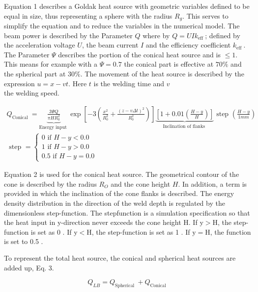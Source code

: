\documentclass[10pt]{article}
\begin{document}
Equation 1 describes a Goldak heat source with geometric variables defined to be equal in size, thus representing a sphere with the radius $R_{g}$. This serves to simplify the equation and to reduce the variables in the numerical model. The beam power is described by the Parameter $Q$ where by $Q=U I k_{\text {eff }}$; defined by the acceleration voltage $U$, the beam current $I$ and the efficiency coefficient $k_{\text {eff }}$. The Parameter $\Psi$ describes the portion of the conical heat source and is $\leq 1$. This means for example with a $\Psi=0.7$ the conical part is effective at $70 \%$ and the spherical part at $30 \%$. The movement of the heat source is described by the expression $u=x-v t$. Here $t$ is the welding time and $v$\\
the welding speed.


\begin{gather*}
Q_{\text {Conical }}=\underbrace{\frac{3 \Psi Q}{\pi H R_{0}^{2}}}_{\text {Energy input }} \exp \left[-3\left(\frac{x^{2}}{R_{0}^{2}}+\frac{(z-v \Delta t)^{2}}{R_{0}^{2}}\right)\right] \underbrace{\left[1+0.01\left(\frac{H-y}{H}\right)\right]}_{\text {Inclination of flanks }} \text { step }\left(\frac{H-y}{1 m m}\right)  \tag{2}\\
\text { step }=\left\{\begin{array}{c}
0 \text { if } H-y<0.0 \\
1 \text { if } H-y>0.0 \\
0.5 \text { if } H-y=0.0
\end{array}\right.
\end{gather*}


Equation 2 is used for the conical heat source. The geometrical contour of the cone is described by the radius $R_{O}$ and the cone height $H$. In addition, a term is provided in which the inclination of the cone flanks is described. The energy density distribution in the direction of the weld depth is regulated by the dimensionless step-function. The stepfunction is a simulation specification so that the heat input in y-direction never exceeds the cone height $\mathrm{H}$. If $\mathrm{y}>\mathrm{H}$, the step-function is set as 0 . If $\mathrm{y}<\mathrm{H}$, the step-function is set as 1 . If $\mathrm{y}=\mathrm{H}$, the function is set to 0.5 .

To represent the total heat source, the conical and spherical heat sources are added up, Eq. 3.


\begin{equation*}
Q_{L B}=Q_{\text {Spherical }}+Q_{\text {Conical }} \tag{3}
\end{equation*}
\end{document}
